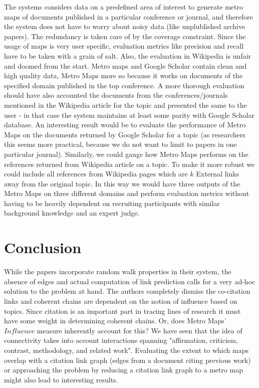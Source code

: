 \documentclass[10pt]{article}
\begin{document}
\par The systems considers data on a predefined area of interest to generate metro maps of documents published in a particular conference or journal, and therefore the system does not have to worry about noisy data (like unplublished archive papers). The redundancy is taken care of by the coverage constraint. Since the usage of maps is very user specific, evaluation metrics like precision and recall have to be taken with a grain of salt. Also, the evaluation in Wikipedia is unfair and doomed from the start. Metro maps and Google Scholar contain clean and high quality data, Metro Maps more so because it works on documents of the specified domain published in the top conference. A more thorough evaluation should have also accounted the documents from the conferences/journals mentioned in the Wikipedia article for the topic and presented the same to the user - in that case the system maintains at least some parity with Google Scholar database. An interesting result would be to evaluate the performance of Metro Maps on the documents returned by Google Scholar for a topic (as researchers this seems more practical, because we do not want to limit to papers in one particular journal). Similarly, we could gauge how Metro Maps performs on the references returned from Wikipedia article on a topic. To make it more robust we could include all references from Wikipedia pages which are $k$ External links away from the original topic. In this way we would have three outputs of the Metro Maps on three different domains and perform evaluation metrics without having to be heavily dependent on recruiting participants with similar background knowledge and an expert judge.  

\section{Conclusion}
\par While the papers incorporate random walk properties in their system, the absence of edges and actual computation of link prediction calls for a very ad-hoc solution to the problem at hand. The authors completely dismiss the co-citation links and coherent chains are dependent on the notion of influence based on topics. Since citation is an important part in tracing lines of research it must have some weight in determining coherent chains. Or, does Metro Maps' $Influence$ measure inherently account for this? We have seen that the idea of connectivity takes into account interactions spanning "affirmation, criticism, contrast, methodology, and related work". Evaluating the extent to which maps overlap with a citation link graph (edges from a document citing previous work) or approaching the problem by reducing a citation link graph to a metro map might also lead to interesting results.  



\end{document}
